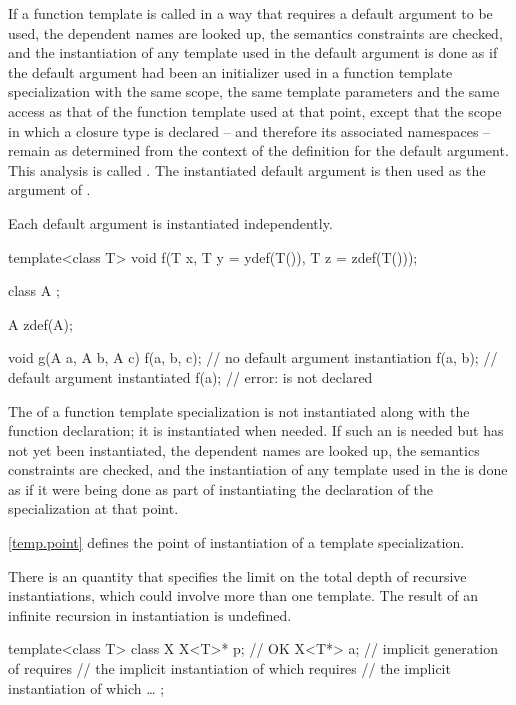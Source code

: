 \pnum
If a function template
is called in a way that requires a default argument to be used,
the dependent names are looked up, the semantics constraints are checked,
and the instantiation of any template used in the default argument
is done as if the default argument had been
an initializer used in a function template specialization with the same scope,
the same template parameters and the same access as that of the function template
used at that point, except that the scope in which a closure type is
declared -- and therefore its associated namespaces --
remain as determined from the context of the definition for the default
argument.
This analysis is called
.
The instantiated default argument is then used as the argument of
.

\pnum
Each default argument is instantiated independently.
\begin{example}
\begin{codeblock}
template<class T> void f(T x, T y = ydef(T()), T z = zdef(T()));

class  A { };

A zdef(A);

void g(A a, A b, A c) {
  f(a, b, c);       // no default argument instantiation
  f(a, b);          // default argument  instantiated
  f(a);             // error:  is not declared
}
\end{codeblock}
\end{example}

\pnum
The  of a function template specialization
is not instantiated along with the function declaration; it is instantiated
when needed. If such an
 is needed but has not yet been
instantiated, the dependent names are looked up, the semantics constraints are
checked, and the instantiation of any template used in the
 is done as if it were being done as part
of instantiating the declaration of the specialization at that point.

\pnum
\begin{note}
\ref{temp.point} defines the point of instantiation of a template specialization.
\end{note}

\pnum
There is an  quantity
that specifies the limit on the total depth of recursive instantiations,
which could involve more than one template.
The result of an infinite recursion in instantiation is undefined.
\begin{example}
\begin{codeblock}
template<class T> class X {
  X<T>* p;          // OK
  X<T*> a;          // implicit generation of  requires
                    // the implicit instantiation of  which requires
                    // the implicit instantiation of  which \ldots
};
\end{codeblock}
\end{example}

